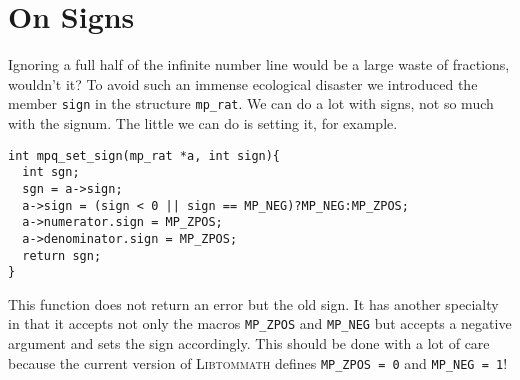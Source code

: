 \documentclass[10pt]{book}
\newcommand{\aname}[1]{{\scshape{#1}}}
\theoremstyle{definition}
\theoremstyle{remark}
\begin{document}
\section{On Signs}
Ignoring a full half of the infinite number line would be a large waste of
fractions, wouldn't it? To avoid such an immense ecological disaster we
introduced the member \lstinline!sign! in the structure \lstinline!mp_rat!.
We can do a lot with signs, not so much with the signum. The little we can do is
setting it, for example.
 \begin{center}
    \begin{lstlisting}[caption={Set Sign of Rational},label=setsignrat]
int mpq_set_sign(mp_rat *a, int sign){
  int sgn;
  sgn = a->sign;
  a->sign = (sign < 0 || sign == MP_NEG)?MP_NEG:MP_ZPOS;
  a->numerator.sign = MP_ZPOS;
  a->denominator.sign = MP_ZPOS;
  return sgn;
}
    \end{lstlisting}
  \end{center}
This function does not return an error but the old sign. It has another specialty
in that it accepts not only the macros \lstinline!MP_ZPOS! and \lstinline!MP_NEG!
but accepts a negative argument and sets the sign accordingly. This should be
done with a lot of care because the current version of \aname{Libtommath} defines
 \lstinline!MP_ZPOS = 0! and \lstinline!MP_NEG = 1!!
\end{document}
